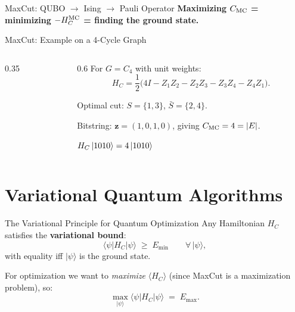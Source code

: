 \documentclass{beamer}
\begin{document}
\begin{frame}
\begin{frame}{MaxCut: QUBO $\to$ Ising $\to$ Pauli Operator}
\textbf{Maximizing $C_{\rm MC}$ = minimizing $-H_C^{\rm MC}$ = finding
the ground state.}
\end{frame}


\begin{frame}{MaxCut: Example on a 4-Cycle Graph}
\begin{columns}
\begin{column}{0.35\textwidth}
\centering
{}
\end{column}
\begin{column}{0.6\textwidth}
For $G = C_4$ with unit weights:
\[
H_C = \frac{1}{2}
\bigl(
4I - Z_1Z_2 - Z_2Z_3 - Z_3Z_4 - Z_4Z_1
\bigr).
\]

Optimal cut: $S=\{1,3\}$, $\bar S=\{2,4\}$.

Bitstring: $\mathbf{z}=(1,0,1,0)$, giving $C_{\rm MC}=4=|E|$.

\medskip
$H_C\ket{1010} = 4\ket{1010}$ \checkmark
\end{column}
\end{columns}
\end{frame}


\section{Variational Quantum Algorithms}

\begin{frame}{The Variational Principle for Quantum Optimization}
Any Hamiltonian $H_C$ satisfies the \textbf{variational bound}:
\[
\langle\psi|H_C|\psi\rangle \;\ge\; E_{\min}
\qquad\forall\,|\psi\rangle,
\]
with equality iff $|\psi\rangle$ is the ground state.

\medskip

For optimization we want to \emph{maximize} $\langle H_C \rangle$
(since MaxCut is a maximization problem), so:
\[
\max_{|\psi\rangle}\langle\psi|H_C|\psi\rangle \;=\; E_{\max}.
\]


\end{frame}
\end{frame}
\end{document}
